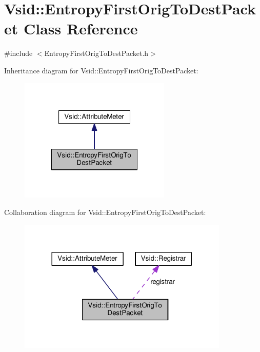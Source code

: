 \hypertarget{class_vsid_1_1_entropy_first_orig_to_dest_packet}{\section{Vsid\-:\-:Entropy\-First\-Orig\-To\-Dest\-Packet Class Reference}
\label{class_vsid_1_1_entropy_first_orig_to_dest_packet}
}


{\ttfamily \#include $<$Entropy\-First\-Orig\-To\-Dest\-Packet.\-h$>$}



Inheritance diagram for Vsid\-:\-:Entropy\-First\-Orig\-To\-Dest\-Packet\-:
\nopagebreak
\begin{figure}[H]
\begin{center}
\leavevmode
\includegraphics[width=204pt]{class_vsid_1_1_entropy_first_orig_to_dest_packet__inherit__graph}
\end{center}
\end{figure}


Collaboration diagram for Vsid\-:\-:Entropy\-First\-Orig\-To\-Dest\-Packet\-:
\nopagebreak
\begin{figure}[H]
\begin{center}
\leavevmode
\includegraphics[width=284pt]{class_vsid_1_1_entropy_first_orig_to_dest_packet__coll__graph}
\end{center}
\end{figure}
